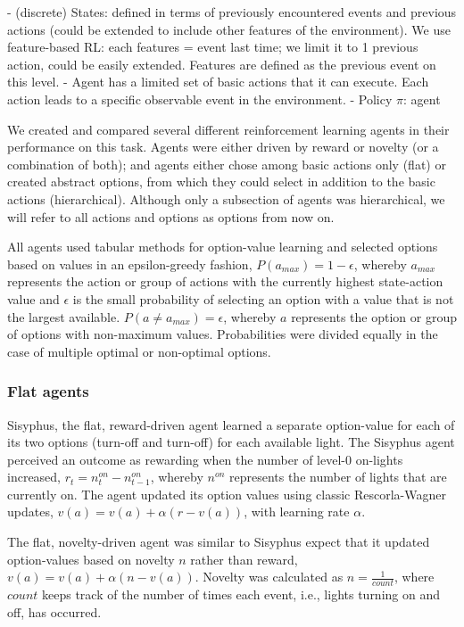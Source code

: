 \documentclass{article}
\begin{document}
- (discrete) States: defined in terms of previously encountered events and previous actions (could be extended to include other features of the environment). We use feature-based RL: each features = event last time; we limit it to 1 previous action, could be easily extended. Features are defined as the previous event on this level.
- Agent has a limited set of basic actions that it can execute. Each action leads to a specific observable event in the environment.
- Policy $\pi$: agent 



We created and compared several different reinforcement learning agents in their performance on this task. Agents were either driven by reward or novelty (or a combination of both); and agents either chose among basic actions only (flat) or created abstract options, from which they could select in addition to the basic actions (hierarchical). Although only a subsection of agents was hierarchical, we will refer to all actions and options as options from now on.

All agents used tabular methods for option-value learning and selected options based on values in an epsilon-greedy fashion, $P(a_{max}) = 1 - \epsilon$, whereby $a_{max}$ represents the action or group of actions with the currently highest state-action value and $\epsilon$ is the small probability of selecting an option with a value that is not the largest available. $P(a \neq a_{max}) = \epsilon$, whereby $a$ represents the option or group of options with non-maximum values. Probabilities were divided equally in the case of multiple optimal or non-optimal options. 


\subsubsection{Flat agents}

Sisyphus, the flat, reward-driven agent learned a separate option-value for each of its two options (turn-off and turn-off) for each available light. The Sisyphus agent perceived an outcome as rewarding when the number of level-0 on-lights increased, $r_t = n_t^{on} - n_{t-1}^{on}$, whereby $n^{on}$ represents the number of lights that are currently on. The agent updated its option values using classic Rescorla-Wagner updates, $v(a) = v(a) + \alpha (r - v(a))$, with learning rate $\alpha$.

The flat, novelty-driven agent was similar to Sisyphus expect that it updated option-values based on novelty $n$ rather than reward, $v(a) = v(a) + \alpha (n - v(a))$. Novelty was calculated as $n = \frac{1}{count}$, where $count$ keeps track of the number of times each event, i.e., lights turning on and off, has occurred. 
\end{document}
